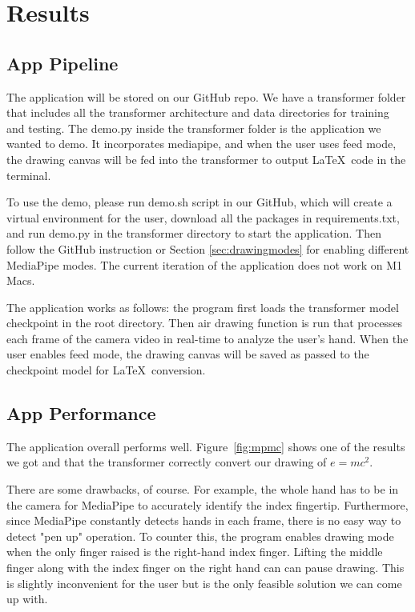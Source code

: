 \section{Results}
\label{sec:results}

\subsection{App Pipeline}

The application will be stored on our GitHub repo. We have a transformer folder that includes all the transformer architecture and data directories for training and testing. The demo.py inside the transformer folder is the application we wanted to demo. It incorporates mediapipe, and when the user uses feed mode, the drawing canvas will be fed into the transformer to output \LaTeX\ code in the terminal. 

To use the demo, please run demo.sh script in our GitHub, which will create a virtual environment for the user, download all the packages in requirements.txt, and run demo.py in the transformer directory to start the application. Then follow the GitHub instruction or Section \ref{sec:drawingmodes} for enabling different MediaPipe modes. The current iteration of the application does not work on M1 Macs.

The application works as follows: the program first loads the transformer model checkpoint in the root directory. Then air drawing function is run that processes each frame of the camera video in real-time to analyze the user's hand. When the user enables feed mode, the drawing canvas will be saved as passed to the checkpoint model for \LaTeX\ conversion. 

\subsection{App Performance}
The application overall performs well. Figure~\ref{fig:mpmc} shows one of the results we got and that the transformer correctly convert our drawing of $e=mc^2$. 

There are some drawbacks, of course. For example, the whole hand has to be in the camera for MediaPipe to accurately identify the index fingertip. Furthermore, since MediaPipe constantly detects hands in each frame, there is no easy way to detect "pen up" operation. To counter this, the program enables drawing mode when the only finger raised is the right-hand index finger. Lifting the middle finger along with the index finger on the right hand can can pause drawing. This is slightly inconvenient for the user but is the only feasible solution we can come up with. 

